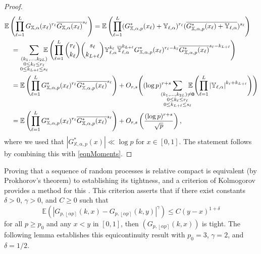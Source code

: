 \documentclass[reqno]{amsart}
\numberwithin{equation}{section}
\numberwithin{table}{section}
\numberwithin{figure}{section}
\newcommand{\abs}[1]{\left\lvert#1\right\rvert}
\newcommand{\round}[1]{\left\lfloor#1\right\rceil}
\begin{document}
\begin{proof}
\begin{align*}
&\mathbb{E}\left(\prod_{\ell=1}^L G_{\mathbb{X},\alpha}(x_\ell)^{r_\ell} \overline{G_{\mathbb{X},\alpha}(x_\ell)}^{s_\ell}\right)
=
\mathbb{E}\left(\prod_{\ell=1}^L (G^*_{\mathbb{X},\alpha,p}(x_\ell)+\mathbb{Y}_{\ell,\alpha})^{r_\ell} (\overline{G^*_{\mathbb{X},\alpha,p}(x_\ell)+\mathbb{Y}_{\ell,\alpha}})^{s_\ell}\right)\\
&\quad =
\sum_{\substack{(k_1,\ldots,k_{2L})\\0\leq k_\ell\leq r_\ell\\0\leq k_{L+\ell}\leq s_\ell}}
\hspace{-2ex}\mathbb{E}\left(\prod_{\ell=1}^L \binom{r_\ell}{k_\ell} \binom{s_\ell}{k_{L+\ell}} \mathbb{Y}_{\ell,\alpha}^{k_\ell} \overline{\mathbb{Y}}_{\ell,\alpha}^{k_{L+\ell}} G^*_{\mathbb{X},\alpha,p}(x_\ell)^{r_\ell-k_\ell} \overline{G^*_{\mathbb{X},\alpha,p}(x_\ell)}^{s_\ell-k_{L+\ell}}\right)\\
&\quad =
\mathbb{E}\left(\prod_{\ell=1}^L G^*_{\mathbb{X},\alpha,p}(x_\ell)^{r_\ell} \overline{G^*_{\mathbb{X},\alpha,p}(x_\ell)}^{s_\ell}\right)
 + O_{r,s}\Biggl((\log p)^{r+s}
  \hspace{-4ex}\sum_{\substack{(k_1,\ldots,k_{2L})\neq\mathbf{0}\\0\leq k_\ell\leq r_\ell\\0\leq k_{L+\ell}\leq s_\ell}}
  \hspace{-2.5ex}\mathbb{E}\left(\prod_{\ell=1}^L \abs{\mathbb{Y}_{\ell,\alpha}}^{k_\ell+k_{L+\ell}}\right)
\Biggr)\\
&\quad =
\mathbb{E}\left(\prod_{\ell=1}^L G^*_{\mathbb{X},\alpha,p}(x_\ell)^{r_\ell} \overline{G^*_{\mathbb{X},\alpha,p}(x_\ell)}^{s_\ell}\right) + O_{r,s}\left(\frac{(\log p)^{r+s}}{\sqrt{p}}\right),
\end{align*}
where we used that $\abs{G^*_{\mathbb{X},\alpha,p}(x)} \ll \log p$ for $x\in[0,1]$.
The statement follows by combining this with \eqref{eqnMoments}.
\end{proof}

Proving that a sequence of random processes is relative compact is equivalent (by Prokhorov's theorem) to establishing its tightness, and a criterion of Kolmogorov provides a method for this \cite[Chapter~1]{Krylov02}.
This criterion asserts that if there exist constants $\delta>0$, $\gamma>0$, and $C\geq0$ such that
\[
\mathbb{E}\left(\abs{G_{p,\round{\alpha p}}(k, x) - G_{p,\round{\alpha p}}(k, y)}^\gamma\right) \leq C(y-x)^{1+\delta} 
\]
for all $p\geq p_0$ and any $x<y$ in $[0,1]$, then $(G_{p,\round{\alpha p}}(k, x))$ is tight.
The following lemma establishes this equicontinuity result with $p_0=3$, $\gamma=2$, and $\delta=1/2$.
\end{document}
